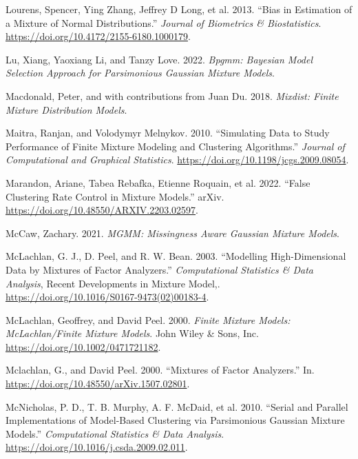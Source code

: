 \begin{CSLReferences}{1}{0}
\leavevmode{}%
Lourens, Spencer, Ying Zhang, Jeffrey D Long, et al. 2013. {``Bias in {Estimation} of a {Mixture} of {Normal Distributions}.''} \emph{Journal of Biometrics \& Biostatistics}. \url{https://doi.org/10.4172/2155-6180.1000179}.

\leavevmode{}%
Lu, Xiang, Yaoxiang Li, and Tanzy Love. 2022. \emph{Bpgmm: Bayesian Model Selection Approach for Parsimonious Gaussian Mixture Models}.

\leavevmode{}%
Macdonald, Peter, and with contributions from Juan Du. 2018. \emph{Mixdist: Finite Mixture Distribution Models}.

\leavevmode{}%
Maitra, Ranjan, and Volodymyr Melnykov. 2010. {``Simulating {Data} to {Study Performance} of {Finite Mixture Modeling} and {Clustering Algorithms}.''} \emph{Journal of Computational and Graphical Statistics}. \url{https://doi.org/10.1198/jcgs.2009.08054}.

\leavevmode{}%
Marandon, Ariane, Tabea Rebafka, Etienne Roquain, et al. 2022. {``False Clustering Rate Control in Mixture Models.''} arXiv. \url{https://doi.org/10.48550/ARXIV.2203.02597}.

\leavevmode{}%
McCaw, Zachary. 2021. \emph{MGMM: Missingness Aware Gaussian Mixture Models}.

\leavevmode{}%
McLachlan, G. J., D. Peel, and R. W. Bean. 2003. {``Modelling High-Dimensional Data by Mixtures of Factor Analyzers.''} \emph{Computational Statistics \& Data Analysis}, Recent {Developments} in {Mixture} {Model},. \url{https://doi.org/10.1016/S0167-9473(02)00183-4}.

\leavevmode{}%
McLachlan, Geoffrey, and David Peel. 2000. \emph{Finite {Mixture Models}: {McLachlan}/{Finite Mixture Models}}. John Wiley \& Sons, Inc. \url{https://doi.org/10.1002/0471721182}.

\leavevmode{}%
Mclachlan, G., and David Peel. 2000. {``Mixtures of {Factor} {Analyzers}.''} In. \url{https://doi.org/10.48550/arXiv.1507.02801}.

\leavevmode{}%
McNicholas, P. D., T. B. Murphy, A. F. McDaid, et al. 2010. {``Serial and Parallel Implementations of Model-Based Clustering via Parsimonious Gaussian Mixture Models.''} \emph{Computational Statistics \& Data Analysis}. \url{https://doi.org/10.1016/j.csda.2009.02.011}.


\end{CSLReferences}
